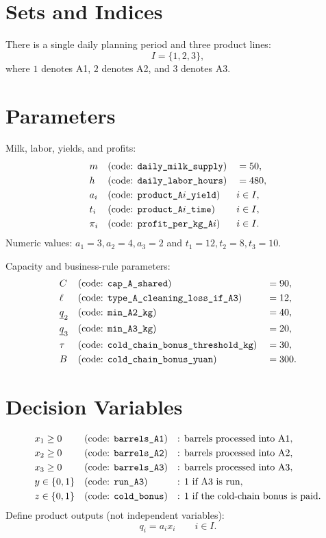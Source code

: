 \section*{Sets and Indices}
There is a single daily planning period and three product lines:
\[
I=\{1,2,3\},
\]
where $1$ denotes A1, $2$ denotes A2, and $3$ denotes A3.

\section*{Parameters}
Milk, labor, yields, and profits:
\[
\begin{aligned}
&m &&\text{(code: \texttt{daily\_milk\_supply})} &&= 50,\\
&h &&\text{(code: \texttt{daily\_labor\_hours})} &&= 480,\\
&a_i &&\text{(code: \texttt{product\_A$i$\_yield})} && i\in I,\\
&t_i &&\text{(code: \texttt{product\_A$i$\_time})} && i\in I,\\
&\pi_i &&\text{(code: \texttt{profit\_per\_kg\_A$i$})} && i\in I.
\end{aligned}
\]
Numeric values: $a_1=3,a_2=4,a_3=2$ and $t_1=12,t_2=8,t_3=10$.

Capacity and business-rule parameters:
\[
\begin{aligned}
&C &&\text{(code: \texttt{cap\_A\_shared})} &&=90,\\
&\ell &&\text{(code: \texttt{type\_A\_cleaning\_loss\_if\_A3})} &&=12,\\
&\underline{q}_2 &&\text{(code: \texttt{min\_A2\_kg})} &&=40,\\
&\underline{q}_3 &&\text{(code: \texttt{min\_A3\_kg})} &&=20,\\
&\tau &&\text{(code: \texttt{cold\_chain\_bonus\_threshold\_kg})} &&=30,\\
&B &&\text{(code: \texttt{cold\_chain\_bonus\_yuan})} &&=300.
\end{aligned}
\]

\section*{Decision Variables}
\[
\begin{aligned}
&x_1 \ge 0 &&\text{(code: \texttt{barrels\_A1})} &&\text{: barrels processed into A1},\\
&x_2 \ge 0 &&\text{(code: \texttt{barrels\_A2})} &&\text{: barrels processed into A2},\\
&x_3 \ge 0 &&\text{(code: \texttt{barrels\_A3})} &&\text{: barrels processed into A3},\\
&y \in \{0,1\} &&\text{(code: \texttt{run\_A3})} &&\text{: 1 if A3 is run},\\
&z \in \{0,1\} &&\text{(code: \texttt{cold\_bonus})} &&\text{: 1 if the cold-chain bonus is paid}.
\end{aligned}
\]
Define product outputs (not independent variables):
\[
q_i=a_i x_i \qquad i\in I.
\]

